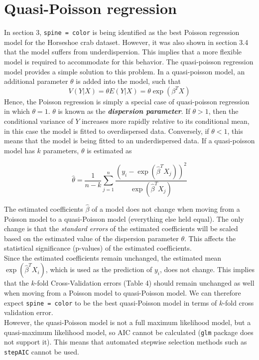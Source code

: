 \documentclass[a4paper, 12pt]{article}
\begin{document}
\section{Quasi-Poisson regression}
In section 3, \texttt{spine = color} is being identified as the best Poisson regression model for the Horseshoe crab dataset. However, it was also shown in section 3.4 that the model suffers from underdispersion. This implies that a more flexible model is required to accommodate for this behavior. The quasi-poisson regression model provides a simple solution to this problem. In a quasi-poisson model, an additional parameter $\theta$ is added into the model, such that 
$$V(Y|X) = \theta E(Y|X) = \theta \exp(\beta^TX)$$
\noindent Hence, the Poisson regression is simply a special case of quasi-poisson regression in which $\theta = 1$. $\theta$ is known as the \textbf{\textit{dispersion parameter}}. If $\theta > 1$, then the conditional variance of $Y$ increases more rapidly relative to its conditional mean, in this case the model is fitted to overdispersed data. Conversely, if $\theta < 1$, this means that the model is being fitted to an underdispersed data. If a quasi-poisson model has $k$ parameters, $\theta$ is estimated as 

$$ \hat{\theta} = \frac{1}{n-k} \sum_{j=1}^{n}{\frac{(y_i - \exp(\hat{\beta}^TX_j))^2}{\exp(\hat{\beta}^TX_j)}} $$

\noindent The estimated coefficients $\hat{\beta}$ of a model does not change when moving from a Poisson model to a quasi-Poisson model (everything else held equal). The only change is that the \textit{standard errors} of the estimated coefficients will be scaled based on the estimated value of the dispersion parameter $\theta$. This affects the statistical significance (p-values) of the estimated coefficients. \\
\indent Since the estimated coefficients remain unchanged, the estimated mean $\exp(\hat{\beta}^TX_i)$, which is used as the prediction of $y_i$, does not change. This implies that the $k$-fold Cross-Validation errors (Table 4) should remain unchanged as well when moving from a Poisson model to quasi-Poisson model. We can therefore expect \texttt{spine = color} to be the best quasi-Poisson model in terms of $k$-fold cross validation error.\\    
\indent However, the quasi-Poisson model is not a full maximum likelihood model, but a quasi-maximum likelihood model, so AIC cannot be calculated (\texttt{glm} package does not support it). This means that automated stepwise selection methods such as \texttt{stepAIC} cannot be used.
\end{document}
